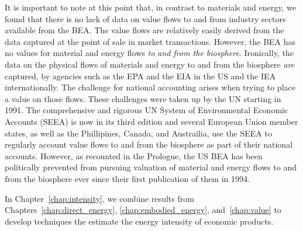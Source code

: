 It is important to note at this point that, in contrast to materials and energy,
we found that there is no lack of data on value flows
to and from industry sectors available 
from the BEA. The value flows
are relatively easily derived from the 
data captured at the point of sale in market transactions. 
However, the BEA has no values for material and energy flows \emph{ to and from the biosphere}.
Ironically, the data on the physical flows of materials and energy
to and from the biosphere \emph{are} captured, by
 agencies such as the EPA and the EIA in the US and the IEA internationally.  
The challenge for national accounting arises when
trying to place a value on those flows. 
These challenges were taken up by
the UN starting in 1991. The comprehensive and rigorous UN System of Environmental Economic Accounts (SEEA)
is now in its third edition
and several European Union member states, as well as  the Phillipines, Canada, and  Austrailia, use
the SEEA
 to regularly account value flows to and from the biosphere
as part of their national accounts.
However, as recounted in the Prologue,  the US BEA has been politically
prevented from pursuing valuation of material and energy
flows to and from the biosphere ever since their 
first publication
of them in 1994.

In Chapter~\ref{chap:intensity}, 
we combine results from Chapters~\ref{chap:direct_energy}, 
\ref{chap:embodied_energy}, and~\ref{chap:value}
to develop techniques the estimate the energy intensity
of economic products.









%
%

